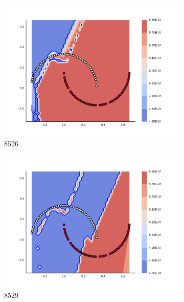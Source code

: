 \begin{figure}[h]
\begin{subfigure}[b]{0.09\textwidth}
    \includegraphics[clip, trim=2.35cm 1.75cm 4.5cm 0cm,width=\textwidth]{img/convergence/8526.pdf}
    \caption{8526}
    \label{fig:convergence_8526}
\end{subfigure}
%
\begin{subfigure}[b]{0.09\textwidth}
    \includegraphics[clip, trim=2.35cm 1.75cm 4.5cm 0cm,width=\textwidth]{img/convergence/8529.pdf}
    \caption{8529}
    \label{fig:convergence_8529}
\end{subfigure}
%
\begin{subfigure}[b]{0.09\textwidth}

\end{subfigure}
\end{figure}
